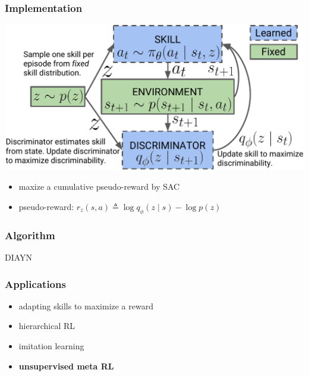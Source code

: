 \documentclass[aspectratio=169]{beamer}
\begin{document}
\begin{frame}
  \frametitle{Implementation}
  \begin{minipage}{0.45\linewidth}
    \includegraphics[width=\linewidth]{imgs/model.pdf}
  \end{minipage} \hfill
  \begin{minipage}{0.45\linewidth}
    \begin{itemize}
      \item maxize a cumulative pseudo-reward by SAC
      \item pseudo-reward: $r_{z}(s, a) \triangleq \log q_{\phi}(z \mid s)-\log p(z)$
    \end{itemize}
  \end{minipage}
\end{frame}

\begin{frame}
  \frametitle{Algorithm}
  \begin{algorithm}[H]
    \small
    \DontPrintSemicolon
    \SetAlgoLined
    \caption{DIAYN}
  \end{algorithm}
\end{frame}

\begin{frame}
  \frametitle{Applications}
  \begin{itemize}
    \item adapting skills to maximize a reward
    \item hierarchical RL
    \item imitation learning
    \item \textbf{unsupervised meta RL}
  \end{itemize}
\end{frame}
\end{document}
